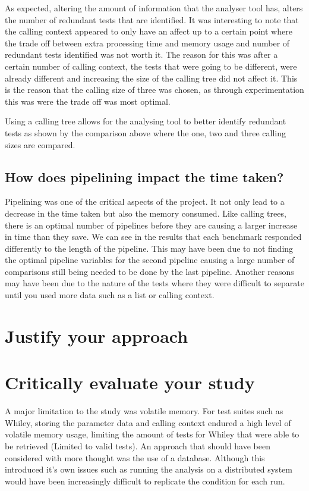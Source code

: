 As expected, altering the amount of information that the analyser tool has, alters the number of redundant tests that are identified. It was interesting to note that the calling context appeared to only have an affect up to a certain point where the trade off between extra processing time and memory usage and number of redundant tests identified was not worth it. The reason for this was after a certain number of calling context, the tests that were going to be different, were already different and increasing the size of the calling tree did not affect it. This is the reason that the calling size of three was chosen, as through experimentation this was were the trade off was most optimal.

Using a calling tree allows for the analysing tool to better identify redundant tests as shown by the comparison above where the one, two and three calling sizes are compared.

\subsection{How does pipelining impact the time taken?}

Pipelining was one of the critical aspects of the project. It not only lead to a decrease in the time taken but also the memory consumed. Like calling trees, there is an optimal number of pipelines before they are causing a larger increase in time than they save. We can see in the results that each  benchmark responded differently to the length of the pipeline. This may have been due to not finding the optimal pipeline variables for the second pipeline causing a large number of comparisons still being needed to be done by the last pipeline. Another reasons may have been due to the nature of the tests where they were difficult to separate until you used more data such as a list or calling context. 

\section{Justify your approach}




\section{Critically evaluate your study}

A major limitation to the study was volatile memory. For test suites such as Whiley, storing the parameter data and calling context endured a high level of volatile memory usage, limiting the amount of tests for Whiley that were able to be retrieved (Limited to valid tests). An approach that should have been considered with more thought was the use of a database. Although this introduced it's own issues such as running the analysis on a distributed system would have been increasingly difficult to replicate the condition for each run. 

